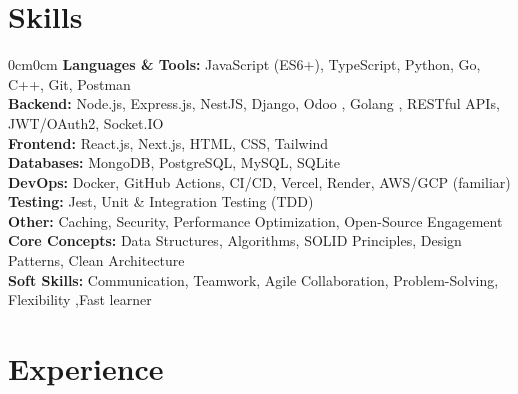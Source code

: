 \documentclass[10pt, letterpaper]{article}
\newenvironment{onecolentry}{\begin{adjustwidth}{0cm}{0cm}}{\end{adjustwidth}}
\begin{document}
\section{Skills}
\begin{onecolentry}
\textbf{Languages \& Tools:} JavaScript (ES6+), TypeScript, Python, Go, C++, Git, Postman \\
\textbf{Backend:} Node.js, Express.js, NestJS, Django, Odoo , Golang ,  RESTful APIs, JWT/OAuth2, Socket.IO \\
\textbf{Frontend:} React.js, Next.js, HTML, CSS, Tailwind \\
\textbf{Databases:} MongoDB, PostgreSQL, MySQL, SQLite \\
\textbf{DevOps:} Docker, GitHub Actions, CI/CD, Vercel, Render, AWS/GCP (familiar) \\
\textbf{Testing:} Jest, Unit \& Integration Testing (TDD) \\
\textbf{Other:} Caching, Security, Performance Optimization, Open-Source Engagement\\
\textbf{Core Concepts:} Data Structures, Algorithms, SOLID Principles, Design Patterns, Clean Architecture\\
\textbf{Soft Skills:} Communication, Teamwork, Agile Collaboration, Problem-Solving, Flexibility ,Fast learner 
\end{onecolentry}

\section{Experience}
\end{document}
